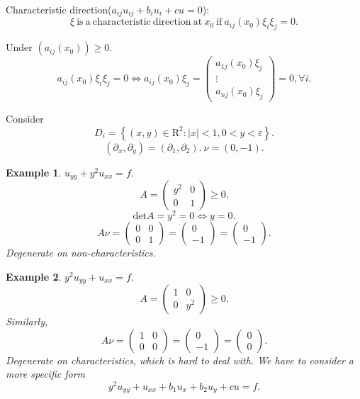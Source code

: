 \documentclass[12pt]{article}
\newtheorem{example}{Example}
\begin{document}
Characteristic direction($a_{ij}u_{ij}+b_iu_i+cu = 0$): 
\[ \xi \mathrm{\ is\ a\ characteristic\ direction\ at\ } x_0\mathrm{\ if\ } a_{ij}(x_0)\xi_i\xi_j=0. \]

Under $(a_{ij}(x_0))\ge 0$.
\begin{equation*}
a_{ij}(x_0)\xi_i\xi_j = 0 \iff a_{ij}(x_0)\xi_j=
\left( 
	\begin{array}{c}
		a_{1j}(x_0)\xi_j\\
		\vdots\\
		a_{nj}(x_0)\xi_j
	\end{array}
\right)
=0, \forall i.
\end{equation*}

Consider 
\[ D_i = \left\{ (x, y)\in\mathrm{R}^2:|x|<1, 0<y<\varepsilon \right\} .\]
\[ (\partial_x, \partial_y) = (\partial_1, \partial_2).\ \nu = (0, -1). \]
\begin{example}
$u_{yy} + y^2u_{xx} = f.$
\begin{equation*}
A=\left(
	\begin{array}{cc}
		y^2 & 0\\
		0 & 1
	\end{array}
\right)\ge 0.
\end{equation*}
\[ \mathrm{det}A=y^2=0 \iff y=0. \]
\begin{equation*}
	A\nu=\left(
		\begin{array}{cc}
			0 & 0\\
			0 & 1
		\end{array}
	\right)=\left(
		\begin{array}{c}
			0\\
			-1
		\end{array}
	\right)=\left(
		\begin{array}{c}
			0\\
			-1
		\end{array}
	\right).
\end{equation*}
Degenerate on non-characteristics.
\end{example}
\begin{example}
$y^2u_{yy} + u_{xx} = f.$
\begin{equation*}
A=\left(
	\begin{array}{cc}
		1 & 0\\
		0 & y^2
	\end{array}
\right)\ge 0.
\end{equation*}
Similarly,
\begin{equation*}
	A\nu=\left(
		\begin{array}{cc}
			1 & 0\\
			0 & 0
		\end{array}
	\right)=\left(
		\begin{array}{c}
			0\\
			-1
		\end{array}
	\right)=\left(
		\begin{array}{c}
			0\\
			0
		\end{array}
	\right).
\end{equation*}
Degenerate on characteristics, which is hard to deal with. We have to consider a more specific form
\[ y^2u_{yy}+u_{xx} + b_1u_x + b_2u_y + cu = f. \]
\end{example}
\end{document}

